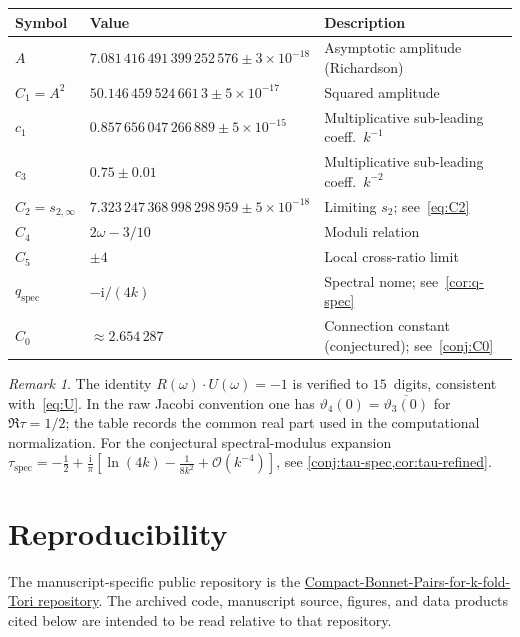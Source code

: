 \documentclass[11pt,a4paper]{article}
\theoremstyle{plain}
\theoremstyle{definition}
\theoremstyle{remark}
\newtheorem{remark}[theorem]{Remark}
\newcommand{\vt}[1]{\vartheta_{#1}}     %
\newcommand{\ii}{\mathrm{i}}
\newcommand{\Oo}{\mathcal{O}}
\begin{document}
\begin{center}
{\small
\begin{tabular}{@{}l>{\raggedleft\arraybackslash}p{}>{\raggedright\arraybackslash}p{}@{}}
\toprule
Symbol & Value & Description \\
\midrule
$A$        & $7.081\,416\,491\,399\,252\,576 \pm 3\times10^{-18}$ & Asymptotic amplitude (Richardson) \\
$C_1 = A^2$& $50.146\,459\,524\,661\,3 \pm 5\times10^{-17}$  & Squared amplitude \\
$c_1$      & $0.857\,656\,047\,266\,889 \pm 5\times10^{-15}$ & Multiplicative sub-leading coeff.\ $k^{-1}$ \\
$c_3$      & $0.75 \pm 0.01$ & Multiplicative sub-leading coeff.\ $k^{-2}$ \\
$C_2 = s_{2,\infty}$ & $7.323\,247\,368\,998\,298\,959 \pm 5\times 10^{-18}$ & Limiting $s_2$; see~\eqref{eq:C2} \\
$C_4$      & $2\omega - 3/10$ & Moduli relation \\
$C_5$      & $\pm 4$ & Local cross-ratio limit \\
$q_{\mathrm{spec}}$   & $-\ii/(4k)$        & Spectral nome; see~\cref{cor:q-spec} \\
$C_0$      & $\approx 2.654\,287$ & Connection constant (conjectured); see~\cref{conj:C0} \\
\bottomrule
\end{tabular}
}
\end{center}

\begin{remark}
  The identity $R(\omega) \cdot U(\omega) = -1$ is verified to
  $15$~digits, consistent with~\eqref{eq:U}.
  In the raw Jacobi convention one has
  $\vt{4}(0) = \overline{\vt{3}(0)}$ for $\Re\tau = 1/2$;
  the table records the common real part used in the computational
  normalization.  For the conjectural spectral-modulus expansion
  $\tau_{\mathrm{spec}} = -\tfrac12 + \tfrac{\ii}{\pi}
  [\ln(4k) - \tfrac{1}{8k^2} + \Oo(k^{-4})]$, see
  \cref{conj:tau-spec,cor:tau-refined}.
\end{remark}

\section{Reproducibility}\label{app:repro}

The manuscript-specific public repository is the
\href{https://github.com/aconsciousfractal/Compact-Bonnet-Pairs-for-k-fold-Tori}{Compact-Bonnet-Pairs-for-k-fold-Tori repository}.
The archived code, manuscript source, figures, and data products cited
below are intended to be read relative to that repository.
\end{document}
